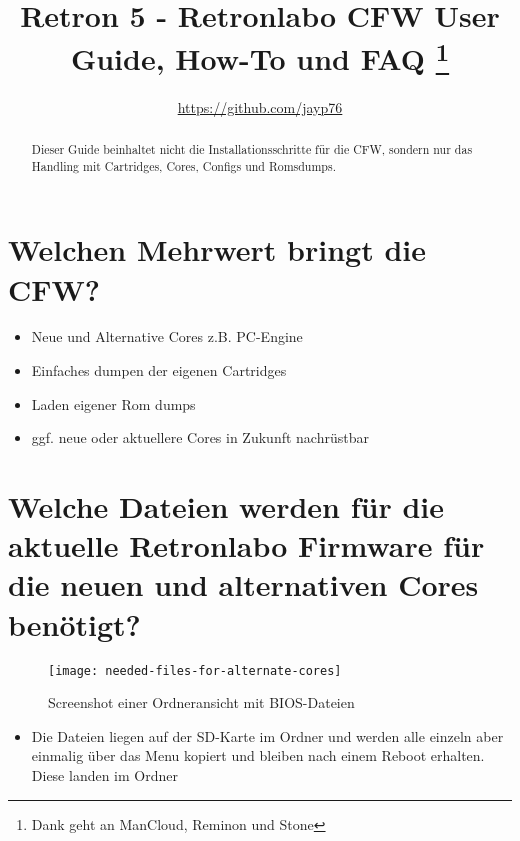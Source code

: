 \documentclass[german]{retronlabo-manual}
\title{Retron 5 - Retronlabo CFW User Guide, How-To und FAQ
\thanks{Dank geht an ManCloud, Reminon und Stone}}
\author{\url{https://github.com/jayp76}}
\begin{document}
\maketitle

\begin{abstract}
Dieser Guide beinhaltet nicht die Installationsschritte f\"ur die CFW, sondern nur das Handling mit Cartridges, Cores, Configs und Romsdumps.
\end{abstract}

\FrontMatter

\section{Welchen Mehrwert bringt die CFW?}

\begin{itemize}
  \item Neue und Alternative Cores z.B. PC-Engine
  \item Einfaches dumpen der eigenen Cartridges
  \item Laden eigener Rom dumps
  \item ggf. neue oder aktuellere Cores in Zukunft nachr\"ustbar
\end{itemize}


\section{Welche Dateien werden f\"ur die aktuelle Retronlabo Firmware f\"ur die neuen und alternativen Cores ben\"otigt?}

\begin{figure}[h]
\caption{Screenshot einer Ordneransicht mit BIOS-Dateien}
\texttt{[image: needed-files-for-alternate-cores]}
\label{fig:needed-files-for-alternate-cores}
\end{figure}

\begin{itemize}
  \item Die Dateien liegen auf der SD-Karte im  Ordner und werden alle einzeln aber einmalig \"uber das Menu kopiert und bleiben nach einem Reboot erhalten. Diese landen im Ordner 
\end{itemize}
\end{document}
